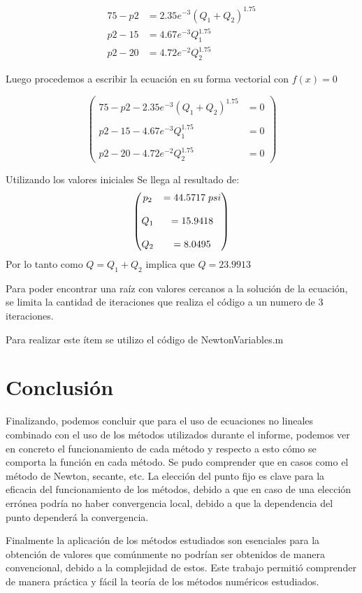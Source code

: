 \documentclass{udpreport}
\begin{document}
\begin{enumerate}
    \begin{align*} 
        75 - p2 &=  2.35e^{-3}(Q_1+Q_2)^{1.75} \\ 
        p2 - 15 &= 4.67e^{-3}Q_1^{1.75} \\
        p2 - 20 &= 4.72e^{-2}Q_2^{1.75}
    \end{align*}
    
    Luego procedemos a escribir la ecuación en su forma vectorial con  $f(x) = 0$

   $$\begin{pmatrix}
        75 - p2 - 2.35e^{-3}(Q_1+Q_2)^{1.75} &= 0 \\
        \\
        p2 - 15 - 4.67e^{-3}Q_1^{1.75} &= 0  \\
        \\
        p2 - 20 - 4.72e^{-2}Q_2^{1.75} &= 0
    \end{pmatrix}$$
    
    Utilizando los valores iniciales Se llega al resultado de: 
    $$\begin{pmatrix}
        p_2 &=44.5717 \hspace{0.1cm} psi \\
        \\
        Q_1 &=15.9418 \\
        \\
        Q_2 &=8.0495
    \end{pmatrix}$$
    Por lo tanto como $Q = Q_1 + Q_2 $ implica que $ Q = 23.9913 $
    
    Para poder encontrar una raíz con valores cercanos a la solución de la ecuación, se limita la cantidad de iteraciones que realiza el código a un numero de 3 iteraciones.
    
    Para realizar este ítem se utilizo el código de NewtonVariables.m
    \end{enumerate}
    \newpage

    \chapter{Conclusión}
    
   Finalizando, podemos concluir que para el uso de ecuaciones no lineales  combinado con el uso de los métodos utilizados durante el informe, podemos ver en concreto el funcionamiento de cada método y respecto a esto cómo se comporta la función en cada método. Se pudo comprender que en casos como el método de Newton, secante, etc. La elección del punto fijo es clave para la eficacia del funcionamiento de los métodos, debido a que en caso de una elección errónea podría no haber convergencia local, debido a que la dependencia del punto dependerá la convergencia. 
   
   Finalmente la aplicación de los métodos estudiados son esenciales para la obtención de valores que comúnmente no podrían ser obtenidos de manera convencional, debido a la complejidad de estos. Este trabajo permitió comprender de manera práctica y fácil la teoría de los métodos numéricos estudiados.
      
\end{document}
